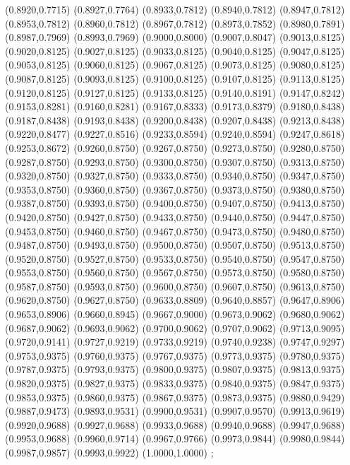 {(0.8920,0.7715) (0.8927,0.7764) (0.8933,0.7812) (0.8940,0.7812) (0.8947,0.7812) (0.8953,0.7812)
(0.8960,0.7812) (0.8967,0.7812) (0.8973,0.7852) (0.8980,0.7891) (0.8987,0.7969) (0.8993,0.7969)
(0.9000,0.8000) (0.9007,0.8047) (0.9013,0.8125) (0.9020,0.8125) (0.9027,0.8125) (0.9033,0.8125)
(0.9040,0.8125) (0.9047,0.8125) (0.9053,0.8125) (0.9060,0.8125) (0.9067,0.8125) (0.9073,0.8125)
(0.9080,0.8125) (0.9087,0.8125) (0.9093,0.8125) (0.9100,0.8125) (0.9107,0.8125) (0.9113,0.8125)
(0.9120,0.8125) (0.9127,0.8125) (0.9133,0.8125) (0.9140,0.8191) (0.9147,0.8242) (0.9153,0.8281)
(0.9160,0.8281) (0.9167,0.8333) (0.9173,0.8379) (0.9180,0.8438) (0.9187,0.8438) (0.9193,0.8438)
(0.9200,0.8438) (0.9207,0.8438) (0.9213,0.8438) (0.9220,0.8477) (0.9227,0.8516) (0.9233,0.8594)
(0.9240,0.8594) (0.9247,0.8618) (0.9253,0.8672) (0.9260,0.8750) (0.9267,0.8750) (0.9273,0.8750)
(0.9280,0.8750) (0.9287,0.8750) (0.9293,0.8750) (0.9300,0.8750) (0.9307,0.8750) (0.9313,0.8750)
(0.9320,0.8750) (0.9327,0.8750) (0.9333,0.8750) (0.9340,0.8750) (0.9347,0.8750) (0.9353,0.8750)
(0.9360,0.8750) (0.9367,0.8750) (0.9373,0.8750) (0.9380,0.8750) (0.9387,0.8750) (0.9393,0.8750)
(0.9400,0.8750) (0.9407,0.8750) (0.9413,0.8750) (0.9420,0.8750) (0.9427,0.8750) (0.9433,0.8750)
(0.9440,0.8750) (0.9447,0.8750) (0.9453,0.8750) (0.9460,0.8750) (0.9467,0.8750) (0.9473,0.8750)
(0.9480,0.8750) (0.9487,0.8750) (0.9493,0.8750) (0.9500,0.8750) (0.9507,0.8750) (0.9513,0.8750)
(0.9520,0.8750) (0.9527,0.8750) (0.9533,0.8750) (0.9540,0.8750) (0.9547,0.8750) (0.9553,0.8750)
(0.9560,0.8750) (0.9567,0.8750) (0.9573,0.8750) (0.9580,0.8750) (0.9587,0.8750) (0.9593,0.8750)
(0.9600,0.8750) (0.9607,0.8750) (0.9613,0.8750) (0.9620,0.8750) (0.9627,0.8750) (0.9633,0.8809)
(0.9640,0.8857) (0.9647,0.8906) (0.9653,0.8906) (0.9660,0.8945) (0.9667,0.9000) (0.9673,0.9062)
(0.9680,0.9062) (0.9687,0.9062) (0.9693,0.9062) (0.9700,0.9062) (0.9707,0.9062) (0.9713,0.9095)
(0.9720,0.9141) (0.9727,0.9219) (0.9733,0.9219) (0.9740,0.9238) (0.9747,0.9297) (0.9753,0.9375)
(0.9760,0.9375) (0.9767,0.9375) (0.9773,0.9375) (0.9780,0.9375) (0.9787,0.9375) (0.9793,0.9375)
(0.9800,0.9375) (0.9807,0.9375) (0.9813,0.9375) (0.9820,0.9375) (0.9827,0.9375) (0.9833,0.9375)
(0.9840,0.9375) (0.9847,0.9375) (0.9853,0.9375) (0.9860,0.9375) (0.9867,0.9375) (0.9873,0.9375)
(0.9880,0.9429) (0.9887,0.9473) (0.9893,0.9531) (0.9900,0.9531) (0.9907,0.9570) (0.9913,0.9619)
(0.9920,0.9688) (0.9927,0.9688) (0.9933,0.9688) (0.9940,0.9688) (0.9947,0.9688) (0.9953,0.9688)
(0.9960,0.9714) (0.9967,0.9766) (0.9973,0.9844) (0.9980,0.9844) (0.9987,0.9857) (0.9993,0.9922)
(1.0000,1.0000)
};
